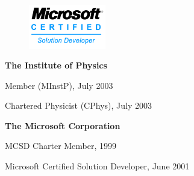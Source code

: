 \documentclass[10pt]{article}
\newenvironment{innerlist}[1][\enskip\textbullet]%
        {\begin{compactitem}[#1]}{\end{compactitem}}
\newcommand{\blankline}{\quad\pagebreak[2]}
\begin{document}
\begin{figure}     \includegraphics[width=0.3\textwidth]{MCSD_logo}\end{figure}

\textbf{The Institute of Physics}
\begin{innerlist}
\item Member (MInstP), July 2003
\item Chartered Physicist (CPhys), July 2003
\end{innerlist}


\textbf{The Microsoft Corporation}
\begin{innerlist}
\item MCSD Charter Member, 1999
\item Microsoft Certified Solution Developer, June 2001
%
\end{innerlist}


%
\end{document}
